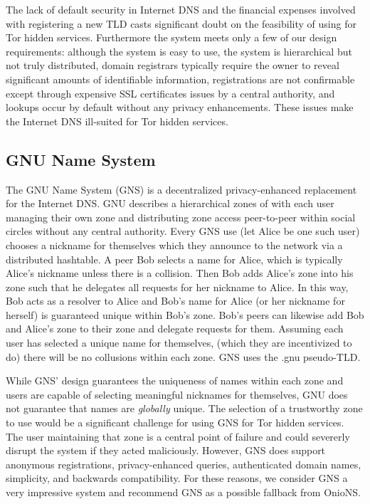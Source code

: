 The lack of default security in Internet DNS and the financial expenses involved with registering a new TLD casts significant doubt on the feasibility of using for Tor hidden services. Furthermore the system meets only a few of our design requirements: although the system is easy to use, the system is hierarchical but not truly distributed, domain registrars typically require the owner to reveal significant amounts of identifiable information, registrations are not confirmable except through expensive SSL certificates issues by a central authority, and lookups occur by default without any privacy enhancements. These issues make the Internet DNS ill-suited for Tor hidden services.

\subsection{GNU Name System}

The GNU Name System\cite{wachs2014censorship} (GNS) is a decentralized privacy-enhanced replacement for the Internet DNS. GNU describes a hierarchical zones of with each user managing their own zone and distributing zone access peer-to-peer within social circles without any central authority. Every GNS use (let Alice be one such user) chooses a nickname for themselves which they announce to the network via a distributed hashtable. A peer Bob selects a name for Alice, which is typically Alice's nickname unless there is a collision. Then Bob adds Alice's zone into his zone such that he delegates all requests for her nickname to Alice. In this way, Bob acts as a resolver to Alice and Bob's name for Alice (or her nickname for herself) is guaranteed unique within Bob's zone. Bob's peers can likewise add Bob and Alice's zone to their zone and delegate requests for them. Assuming each user has selected a unique name for themselves, (which they are incentivized to do) there will be no collusions within each zone. GNS uses the .gnu pseudo-TLD.

While GNS' design guarantees the uniqueness of names within each zone and users are capable of selecting meaningful nicknames for themselves, GNU does not guarantee that names are \emph{globally} unique. The selection of a trustworthy zone to use would be a significant challenge for using GNS for Tor hidden services. The user maintaining that zone is a central point of failure and could severerly disrupt the system if they acted maliciously. However, GNS does support anonymous registrations, privacy-enhanced queries, authenticated domain names, simplicity, and backwards compatibility. For these reasons, we consider GNS a very impressive system and recommend GNS as a possible fallback from OnioNS.

